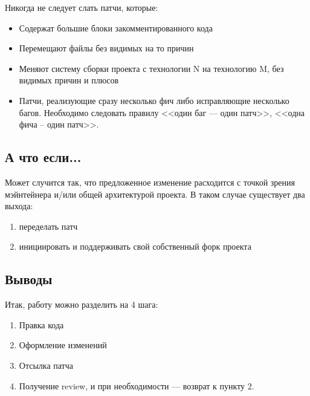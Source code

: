 \documentclass[10pt, a5paper]{article}
\begin{document}
Никогда не следует слать патчи, которые:

\begin{itemize}
    \item     Содержат большие блоки закомментированного кода
    \item Перемещают файлы без видимых на то причин
    \item Меняют систему сборки проекта с технологии N на технологию M, без видимых причин и плюсов
    \item Патчи, реализующие сразу несколько фич либо исправляющие несколько багов. Необходимо следовать правилу <<один баг --- один патч>>, <<одна фича – один патч>>.
\end{itemize}

\subsection*{А что если...}

Может случится так, что предложенное изменение расходится с точкой зрения мэйнтейнера и/или общей архитектурой проекта. В таком случае существует два выхода:

\begin{enumerate}
\item    переделать патч
\item    инициировать и поддерживать свой собственный форк проекта
\end{enumerate}

\subsection*{Выводы}

Итак, работу можно разделить на 4 шага:

\begin{enumerate}
\item    Правка кода
\item Оформление изменений
\item Отсылка патча
\item Получение review, и при необходимости --- возврат к пункту 2.
\end{enumerate}
\end{document}
